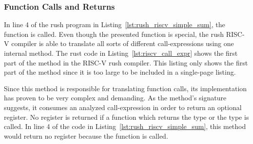 \subsubsection{Function Calls and Returns}

In line 4 of the rush program in Listing~\ref{lst:rush_riscv_simple_sum}, the  function is called.
Even though the presented  function is special, the rush RISC-V compiler is able to translate all sorts of different call-expressions using one internal method.
The rust code in Listing~\ref{lst:riscv_call_expr} shows the first part of the  method in the RISC-V rush compiler.
This listing only shows the first part of the method since it is too large to be included in a single-page listing.


Since this method is responsible for translating function calls, its implementation has proven to be very complex and demanding.
As the method's signature suggests, it consumes an analyzed call-expression in order to return an optional register.
No register is returned if a function which returns the \qVerb{()} type or the \qVerb{!} type is called.
In line 4 of the code in Listing~\ref{lst:rush_riscv_simple_sum}, this method would return no register because the  function is called.

